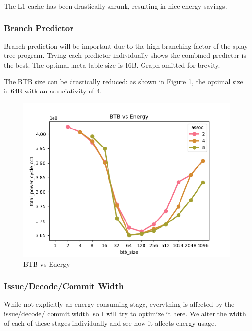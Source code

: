 \documentclass{article}
\newcommand{\optimisation}[1]{
  
}
\begin{document}
\begin{multicols}{2}
  The L1 cache has been drastically shrunk, resulting in nice energy savings.

  \optimisation{il1_cache}

  \subsubsection{Branch Predictor}
  Branch prediction will be important due to the high branching factor of the splay tree program. Trying each predictor individually shows the combined predictor is the best. The optimal meta table size is 16B. Graph omitted for brevity.

  \optimisation{bpred}

  The BTB size can be drastically reduced: as shown in Figure \ref{fig:btb_vs_energy}, the optimal size is 64B with an associativity of 4.

  \begin{figure}[H]
    \centering
    \includegraphics[width=\linewidth]{./assets/btb_vs_energy.png}
    \caption{BTB vs Energy}
    \label{fig:btb_vs_energy}
  \end{figure}

  \optimisation{btb}

  \subsubsection{Issue/Decode/Commit Width}
  While not explicitly an energy-consuming stage, everything is affected by the issue/decode/
  commit width, so I will try to optimize it here. We alter the width of each of these stages individually and see how it affects energy usage.


\end{multicols}
\end{document}
